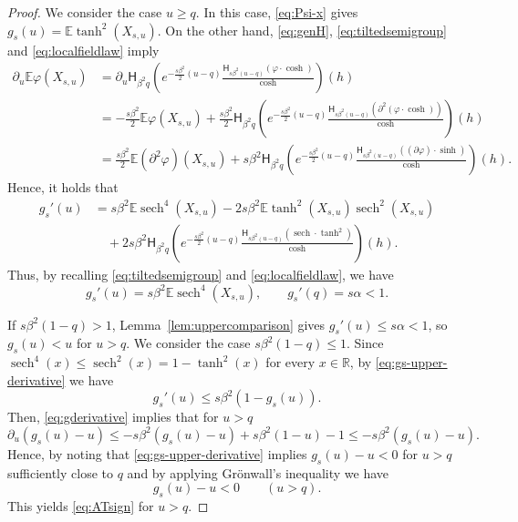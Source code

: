 \documentclass[11pt]{article}
\numberwithin{equation}{section}
\newcommand{\E}{\mathbb{E}}
\newcommand{\1}{\mathbf 1}
\newcommand{\sech}{\operatorname{sech}}
\begin{document}
\begin{proof}
We consider the case $u\ge q$.
In this case, \eqref{eq:Psi-x} gives $g_s(u)=\mathbb{E}\tanh^2(X_{s,u})$.
On the other hand, \eqref{eq:genH}, \eqref{eq:tiltedsemigroup} and \eqref{eq:localfieldlaw} imply
\begin{align*}
\partial _u \E\varphi(X_{s,u}) &= \partial _u \mathsf H_{\beta ^2 q} \left( e^{-\frac{s\beta ^2}{2}(u-q)} \frac{\mathsf H_{s\beta ^2 (u-q)}(\varphi \cdot \cosh )}{\cosh} \right) (h) \\
%
&= -\frac{s\beta ^2}{2}\E\varphi(X_{s,u}) + \frac{s\beta ^2}{2} \mathsf H_{\beta ^2 q} \left( e^{-\frac{s\beta ^2}{2}(u-q)} \frac{\mathsf H_{s\beta ^2 (u-q)}( \partial ^2 (\varphi \cdot \cosh) )}{\cosh} \right) (h) \\
%
&= \frac{s\beta ^2}{2} \E (\partial ^2 \varphi )(X_{s,u}) + s\beta ^2 \mathsf H_{\beta ^2 q} \left( e^{-\frac{s\beta ^2}{2}(u-q)} \frac{\mathsf H_{s\beta ^2 (u-q)}( ( \partial \varphi ) \cdot \sinh )}{\cosh} \right) (h).
\end{align*}
Hence, it holds that
\begin{align*}
g_s'(u) &= s\beta ^2 \E \sech ^4 (X_{s,u}) -2 s\beta ^2 \E \tanh ^2(X_{s,u}) \sech ^2 (X_{s,u})\\
&\quad + 2 s\beta ^2 \mathsf H_{\beta ^2 q} \left( e^{-\frac{s\beta ^2}{2}(u-q)} \frac{\mathsf H_{s\beta ^2 (u-q)}( \sech \cdot \tanh ^2 )}{\cosh} \right) (h).
\end{align*}
Thus, by recalling \eqref{eq:tiltedsemigroup} and \eqref{eq:localfieldlaw}, we have
\begin{equation}
 g_s'(u)=s\beta^2\mathbb{E}\sech^4(X_{s,u}),
 \qquad g_s'(q)=s\alpha<1.
 \label{eq:gs-upper-derivative}
\end{equation}

If $s\beta^2(1-q)>1$, Lemma~\ref{lem:uppercomparison} gives
$g_s'(u)\le s\alpha <1$, so $g_s(u)<u$ for $u>q$.
We consider the case $s\beta^2(1-q)\le1$.
Since
$\sech^4(x)\le\sech^2(x)=1-\tanh^2(x)$ for every $x\in\mathbb R$,
by \eqref{eq:gs-upper-derivative} we have
\begin{equation}\label{eq:gderivative}
 g_s'(u)\le s\beta^2(1-g_s(u)).
\end{equation}
Then, \eqref{eq:gderivative} implies that for $u>q$
\[
\partial _u (g_s(u) -u) \leq -s\beta ^2 (g_s(u)-u) + s\beta ^2 (1-u) -1 \leq -s\beta ^2 (g_s(u)-u) .
\]
Hence, by noting that \eqref{eq:gs-upper-derivative} implies $g_s(u)-u <0$ for $u>q$ sufficiently close to $q$ and by applying Gr\"onwall's inequality we have
\[
g_s(u) - u < 0 \qquad (u>q) .
\]
This yields \eqref{eq:ATsign} for $u>q$.


\end{proof}
\end{document}
